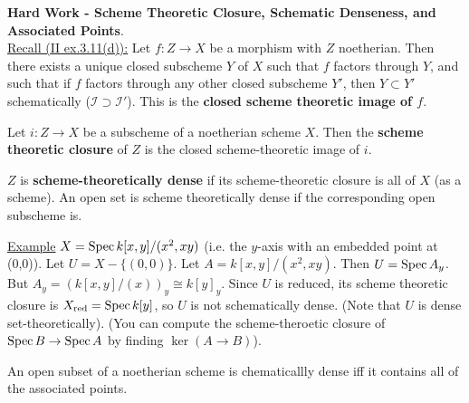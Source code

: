 \textbf{Hard Work - Scheme Theoretic Closure, Schematic Denseness,
and Associated Points}.\\

\underline{Recall (II ex.3.11(d)):} Let $f:Z \rightarrow X$ be a
morphism with $Z$ noetherian. Then there exists a unique closed
subscheme $Y$ of $X$ such that $f$ factors through $Y$, and such
that if $f$ factors through any other closed subscheme $Y'$, then
$Y \subset Y'$ schematically ($\mathscr{I} \supset \mathscr{I}'$).
This is the \textbf{closed scheme theoretic image of $f$}.

\begin{definition} Let $i:Z \rightarrow X$ be a subscheme of a
noetherian scheme $X$. Then the \textbf{scheme theoretic closure}
of $Z$ is the closed scheme-theoretic image of $i$.
\end{definition}

\begin{definition} $Z$ is \textbf{scheme-theoretically dense} if
its scheme-theoretic closure is all of $X$ (as a scheme). An open
set is scheme theoretically dense if the corresponding open
subscheme is. \end{definition}

\underline{Example} $X = \text{\rm Spec\,}{k[x,y]/(x^2,xy)}$ (i.e. the
$y$-axis with an embedded point at (0,0)). Let $U = X -
\{(0,0)\}$. Let $A = k[x,y]/(x^2,xy)$. Then $U = \text{\rm Spec\,}{A_y}$. But
$A_y = (k[x,y]/(x))_y \cong k[y]_y$. Since $U$ is reduced, its
scheme theoretic closure is $X_{\text{red}} = \text{\rm Spec\,}{k[y]} $, so
$U$ is not schematically dense. (Note that $U$ is dense
set-theoretically). (You can compute the scheme-theroetic closure
of $\text{\rm Spec\,}{B}\rightarrow\text{\rm Spec\,}{A}$ by finding $\ker(A\rightarrow
B)$).


\begin{proposition} An open subset of a noetherian scheme is
chematicallly dense iff it contains all of the associated points.
\end{proposition}

